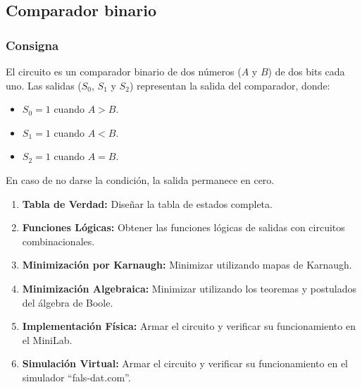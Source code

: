 \subsection{Comparador binario}
\subsubsection{Consigna}
El circuito es un comparador binario de dos números ($A$ y $B$) de dos bits cada uno.
Las salidas ($S_0$, $S_1$ y $S_2$) representan la salida del comparador, donde:

\begin{itemize}
    \item $S_0 = 1$ cuando $A > B$.
    \item $S_1 = 1$ cuando $A < B$.
    \item $S_2 = 1$ cuando $A = B$.
\end{itemize}

En caso de no darse la condición, la salida permanece en cero.

\begin{enumerate}[nosep]
    \item \textbf{Tabla de Verdad:} Diseñar la tabla de estados completa.
    \item \textbf{Funciones Lógicas:} Obtener las funciones lógicas de salidas con circuitos combinacionales.
    \item \textbf{Minimización por Karnaugh:} Minimizar utilizando mapas de Karnaugh.
    \item \textbf{Minimización Algebraica:} Minimizar utilizando los teoremas y postulados del álgebra de Boole.
    \item \textbf{Implementación Física:} Armar el circuito y verificar su funcionamiento en el MiniLab.
    \item \textbf{Simulación Virtual:} Armar el circuito y verificar su funcionamiento en el simulador ``fals-dat.com''.
\end{enumerate}
